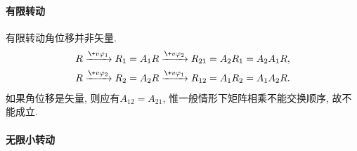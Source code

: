 \documentclass[../LectureNotes.tex]{subfiles}
\begin{document}
\paragraph{有限转动} %
\label{par:有限转动}

有限转动角位移并非矢量.
\begin{align*}
    & R\xrightarrow{\+v\varphi_1} R_1 = A_1 R \xrightarrow{\+v\varphi_2} R_{21} = A_2R_1 = A_2A_1 R, \\
     & R\xrightarrow{\+v\varphi_2} R_2 = A_2 R \xrightarrow{\+v\varphi_1} R_{12} = A_1R_2 = A_1A_2 R.
\end{align*}
如果角位移是矢量, 则应有$A_{12} = A_{21}$, 惟一般情形下矩阵相乘不能交换顺序, 故不能成立.


\paragraph{无限小转动} %
\label{par:无限小转动}
\end{document}
